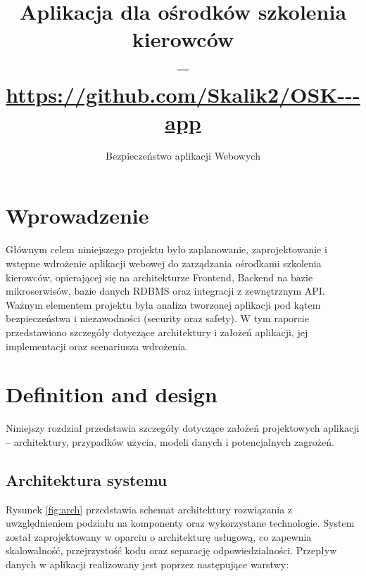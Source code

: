 \documentclass[12pt,twoside]{article}
\title{Aplikacja dla ośrodków szkolenia kierowców \\ -- \\ \url{https://github.com/Skalik2/OSK---app}}
\author{Bezpieczeństwo aplikacji Webowych}
\begin{document}
\maketitle
\tableofcontents
\clearpage


\section{Wprowadzenie}
Głównym celem niniejszego projektu było zaplanowanie, zaprojektowanie i wstępne wdrożenie aplikacji webowej do zarządzania ośrodkami szkolenia kierowców, opierającej się na architekturze Frontend, Backend na bazie mikroserwisów, bazie danych RDBMS oraz integracji z zewnętrznym API. Ważnym elementem projektu była analiza tworzonej aplikacji pod kątem bezpieczeństwa i niezawodności (security oraz safety). W tym raporcie przedstawiono szczegóły dotyczące architektury i założeń aplikacji, jej implementacji oraz scenariusza wdrożenia.


\section{Definition and design}
Niniejszy rozdział przedstawia szczegóły dotyczące założeń projektowych aplikacji -- architektury, przypadków użycia, modeli danych i potencjalnych zagrożeń.

\subsection{Architektura systemu}
Rysunek \ref{fig:arch} przedstawia schemat architektury rozwiązania z uwzględnieniem podziału na komponenty oraz wykorzystane technologie. System został zaprojektowany w oparciu o architekturę usługową, co zapewnia skalowalność, przejrzystość kodu oraz separację odpowiedzialności. Przepływ danych w aplikacji realizowany jest poprzez następujące warstwy:
\end{document}

